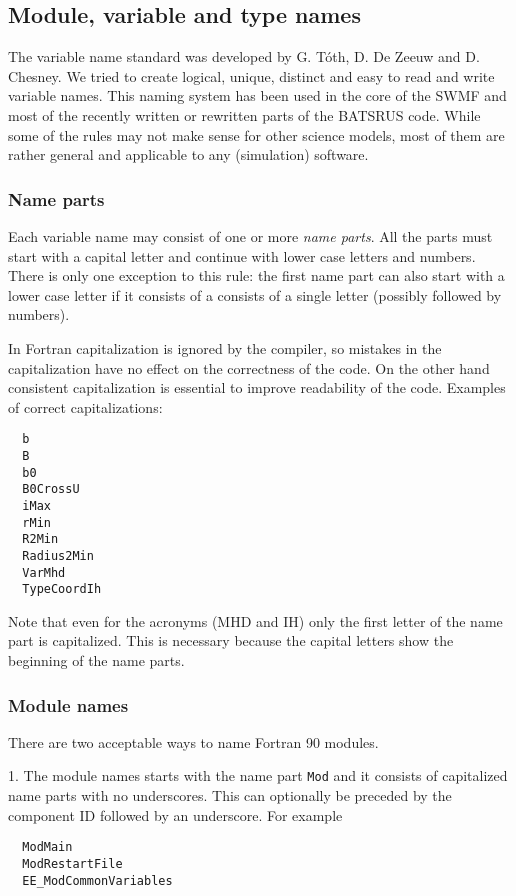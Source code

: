 \documentclass{article}
\begin{document}
\subsection{Module, variable and type names}

The variable name standard was developed by G. T\'oth, D. De Zeeuw
and D. Chesney. We tried to create logical, unique, distinct and easy 
to read and write variable names. This naming system has been used in 
the core of the SWMF and most of the recently written or rewritten parts
of the BATSRUS code. While some of the rules may not make sense for other
science models, most of them are rather general and applicable to any
(simulation) software.

\subsubsection{Name parts}

Each variable name may consist of one or more {\it name parts}.
All the parts must start with a capital letter and continue
with lower case letters and numbers. There is only one exception
to this rule: the first name part can also start with a lower
case letter if it consists of a consists of a single 
letter (possibly followed by numbers).

In Fortran capitalization is ignored by the compiler, 
so mistakes in the capitalization
have no effect on the correctness of the code. On the other hand
consistent capitalization is essential to improve readability of the code.
Examples of correct capitalizations:
\begin{verbatim}
  b
  B
  b0
  B0CrossU
  iMax
  rMin
  R2Min
  Radius2Min
  VarMhd
  TypeCoordIh
\end{verbatim}
Note that even for the acronyms (MHD and IH) 
only the first letter of the name part is capitalized. 
This is necessary because the capital letters show the
beginning of the name parts. 

\subsubsection{Module names}

There are two acceptable ways to name Fortran 90 modules. 

1. The module names starts with the name part {\tt Mod}
and it consists of capitalized name parts with no underscores.
This can optionally be preceded by the component ID followed
by an underscore. For example
\begin{verbatim}
  ModMain
  ModRestartFile
  EE_ModCommonVariables
\end{verbatim}
\end{document}
